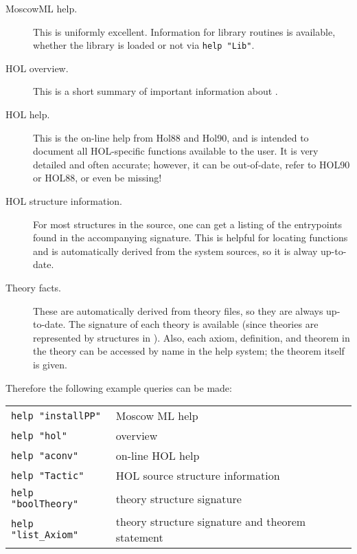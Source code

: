  \begin{description}

 \item [MoscowML help.] This is uniformly excellent. Information for
   library routines is available, whether the library is loaded or not
   via \verb+help "Lib"+.

\item [HOL overview.] This is a short summary of important information
  about \holn{}.

\item [HOL help.] This is the on-line help from Hol88 and Hol90, and
  is intended to document all HOL-specific functions available to the
  user. It is very detailed and often accurate; however, it can be
  out-of-date, refer to HOL90 or HOL88, or even be missing!

\item [HOL structure information.]  For most structures in the \holn{}
  source, one can get a listing of the entrypoints found in the
  accompanying signature. This is helpful for locating functions and
  is automatically derived from the system sources, so it is alway
  up-to-date.

\item [Theory facts.] These are automatically derived from theory
  files, so they are always up-to-date. The signature of each theory
  is available (since theories are represented by structures in
  \holn{}). Also, each axiom, definition, and theorem in the theory can
  be accessed by name in the help system; the theorem itself is given.
 \end{description}

 Therefore the following example queries can be made:

 \begin{table}[h]
\begin{center}
 \begin{tabular}{|l|l|} \hline
  \verb+help "installPP"+ & Moscow ML help \\
  \verb+help "hol"+ &  \holn{} overview \\
  \verb+help "aconv"+ &  on-line HOL help \\
  \verb+help "Tactic"+ & HOL source structure information \\
  \verb+help "boolTheory"+ &  theory structure signature \\
  \verb+help "list_Axiom"+ & theory structure signature and theorem
 statement \\ \hline
 \end{tabular}
\end{center}
 \end{table}

